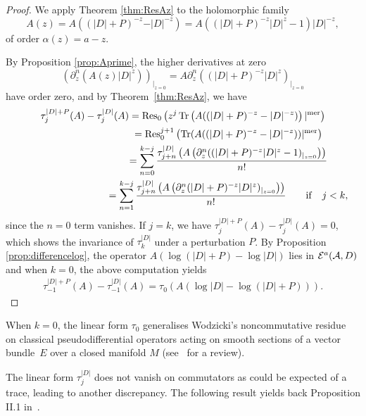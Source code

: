 \documentclass[pdftex]{sigma}
\numberwithin{equation}{section}
\begin{document}
\begin{proof} We  apply  Theorem \ref{thm:ResAz} to the holomorphic family
\[
A(z)= A  ((\vert D\vert+P)^{-z} -\vert D\vert^{-z})=
 A  ((\vert D\vert+P)^{-z} \vert D\vert^{z}-1)\vert D\vert^{-z},
 \] of order
 $\alpha(z)= a-z$.

 By Proposition \ref{prop:Aprime}, the  higher derivatives
at zero
\[
\left(\partial_z^n\left(A(z) \vert
    D\vert^{z}\right)\right)_{\vert_{z=0}}=  A  \partial_z^n\left((\vert
D\vert+P)^{-z} \vert D\vert^{z}\right)_{\vert_{z=0}}
\]
have order zero,  and by Theorem~\ref{thm:ResAz}, we have
\begin{gather*}
\tau_j^{\vert D\vert +P}(A)-\tau_j^{\vert D\vert}(A) =  {\rm Res}_{0}\left(z^j\, {\rm Tr}\left(
 A((\vert D\vert+P)^{-z} -\vert D\vert^{-z})\right) \vert^{\rm mer}\right)\\
 \phantom{\tau_j^{\vert D\vert +P}(A)-\tau_j^{\vert D\vert}(A)}{}
= {\rm Res}_0^{j+1}  \left( {\rm Tr}(A((\vert D\vert+P)^{-z}-\vert
D\vert^{-z}))\vert^{\rm mer}\right)
\\
 \phantom{\tau_j^{\vert D\vert +P}(A)-\tau_j^{\vert D\vert}(A)}{}
 =   \sum_{n=  0}^{k-j} \frac{\tau_{j+n}^{\vert D\vert}\left( A \left(\partial_z^n((\vert D\vert+P)^{-z}  \vert
    D\vert^z-1)_{\vert_{z=0}}\right)\right)}{n!}\\
 \phantom{\tau_j^{\vert D\vert +P}(A)-\tau_j^{\vert D\vert}(A)}{}
 =   \sum_{n=1 }^{k-j} \frac{\tau_{j+n}^{\vert D\vert}\left( A \left(\partial_z^n(\vert D\vert+P)^{-z}  \vert
    D\vert^z)_{\vert_{z=0}}\right)\right)}{n!}\qquad {\rm if}\quad j<k,
\end{gather*}
since the $n=0$   term  vanishes. If $j=k$, we have
$\tau_j^{\vert D\vert +P}(A)-\tau_j^{\vert D\vert}(A)=0$, which shows the inva\-riance of
$\tau_k^{\vert D\vert}$ under a perturbation $P$. By Proposition
 \ref{prop:differencelog},  the operator  $A  \left(\log
    (\vert D\vert+P) -\log \vert D\vert\right)$ lies in ${\cal E}^a({\cal A }, D)$
  and when
  $k=0$, the above computation yields
  \begin{gather*}
   \tau_{-1}^{\vert D\vert +P}(A)-
\tau_{-1}^{\vert D\vert}(A)= \tau_{0}\left( A  \left( \log \vert D\vert-   \log (\vert D\vert+P)\right) \right).\tag*{\qed}
\end{gather*}
\renewcommand{\qed}{}
   \end{proof}

\begin{remark}When $k=0$, the linear form $\tau_0$ generalises Wodzicki's  noncommutative
  resi\-due~\mbox{\cite{Wo1,Wo2}}
  on classical pseudodif\/ferential operators acting on smooth sections of a
  vector bund\-le~$E$ over a closed manifold $M$   (see~\cite{Ka} for
  a review).
\end{remark}
The linear form $\tau_j^{\vert D\vert}$ does not vanish on commutators as could
be expected of a trace, leading to another discrepancy. The following result yields back  Proposition II.1 in~\cite{CoMo}.
\end{document}
